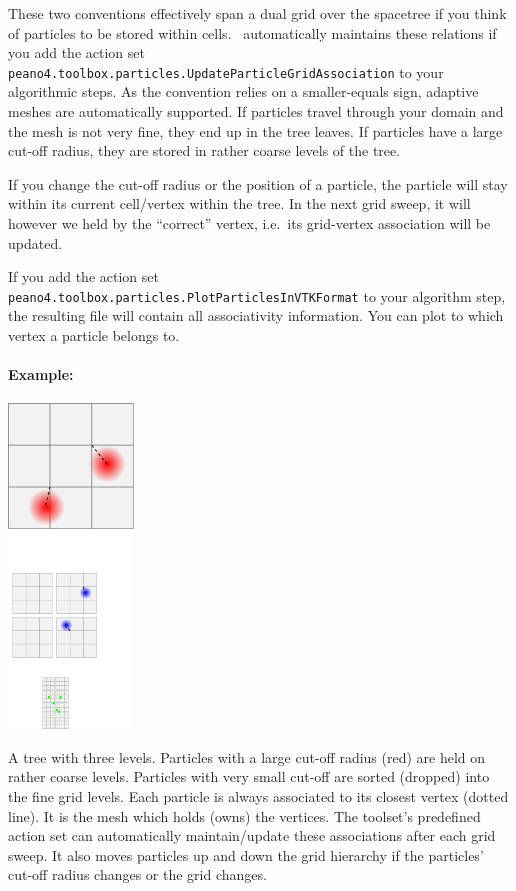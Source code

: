 \noindent
These two conventions effectively span a dual grid over the spacetree if you
think of particles to be stored within cells.
\Peano\ automatically maintains these relations if you add the action set 
\texttt{peano4.toolbox.particles.UpdateParticleGridAssociation} to your
algorithmic steps.
As the convention relies on a smaller-equals sign, adaptive meshes are
automatically supported.
If particles travel through your domain and the mesh is not very fine, they
end up in the tree leaves.
If particles have a large cut-off radius, they are stored in rather coarse
levels of the tree.


If you change the cut-off radius or the position of a particle, the particle
will stay within its current cell/vertex within the tree.
In the next grid sweep, it will however we held by the ``correct'' vertex,
i.e.~its grid-vertex association will be updated.


If you add the action set
\texttt{peano4.toolbox.particles.PlotParticlesInVTKFormat} to your algorithm
step, the resulting file will contain all associativity information.
You can plot to which vertex a particle belongs to.


\paragraph{Example:}

\begin{center}
 \includegraphics[width=0.25\textwidth]{61_pidt/dual-tree.pdf}
\end{center}

\noindent
A tree with three levels.
Particles with a large cut-off radius (red) are held on rather coarse levels.
Particles with very small cut-off are sorted (dropped) into the fine grid
levels.
Each particle is always associated to its closest vertex (dotted line).
It is the mesh which holds (owns) the vertices.
The toolset's predefined action set can automatically maintain/update these
associations after each grid sweep.
It also moves particles up and down the grid hierarchy if the particles' cut-off
radius changes or the grid changes.



